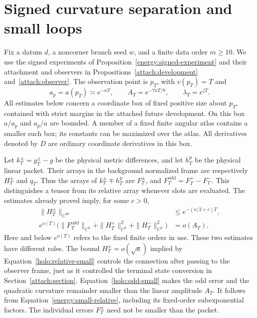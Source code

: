 \section{Signed curvature separation and small loops}
\label{holo:section}

Fix a datum $d$, a noncorner branch seed $w$, and a finite data
order $m\geq10$.  We use the signed experiments of
Proposition~\ref{energy:signed-experiment} and their attachment and
observers in Propositions~\ref{attach:development}
and~\ref{attach:observer}.  The observation point is $p_T$, with
$v(p_T)=T$ and
\[
 a_p=a(p_T)\asymp e^{-\kappa T},\qquad
 A_T=e^{-7\kappa T/8},\qquad \lambda_T=e^{\zeta T}.
\]
All estimates below concern a coordinate box of fixed positive size
about $p_T$, contained with strict margins in the attached future
development.  On this box $a/a_p$ and $a_p/a$ are bounded.  A member
of a fixed finite angular atlas contains a smaller such box; its
constants can be maximized over the atlas.  All derivatives denoted
by $D$ are ordinary coordinate derivatives in this box.

Let $k_T^\pm=g_T^\pm-g$ be the physical metric differences, and let
$h_T^{\mathrm p}$ be the physical linear packet.  Their arrays in
the background normalized frame are respectively $H_T^\pm$ and
$q_T$.  Thus the arrays of $k_T^\pm\mp h_T^{\mathrm p}$ are
$F_T^\pm$, and $F_T^{\mathrm{odd}}=F_T^+-F_T^-$.  This distinguishes
a tensor from its relative array whenever slots are evaluated.
The estimates already proved imply, for some $c>0$,
\begin{align}
 \|H_T^\pm\|_{C^{30}}&\leq
       e^{-(\kappa/2+c)T},                                      \label{holo:relative-small}\\
 e^{o(T)}\bigl(\|F_T^{\mathrm{odd}}\|_{C^2}
       +\|H_T^+\|_{C^2}^2+\|H_T^-\|_{C^2}^2\bigr)&=o(A_T).
                                                               \label{holo:odd-small}
\end{align}
Here and below $e^{o(T)}$ refers to the fixed finite orders in use.
These two estimates have different roles. The bound $H_T^\pm=o(\sqrt a)$
implied by Equation~\eqref{holo:relative-small} controls the connection
after passing to the observer frame, just as it controlled the terminal
state conversion in Section~\ref{attach:section}. Equation~\eqref{holo:odd-small}
makes the odd error and the quadratic curvature remainder smaller than
the linear amplitude $A_T$. It follows from
Equation~\eqref{energy:small-relative}, including its fixed-order
subexponential factors. The individual errors $F_T^\pm$ need not be
smaller than the packet.

